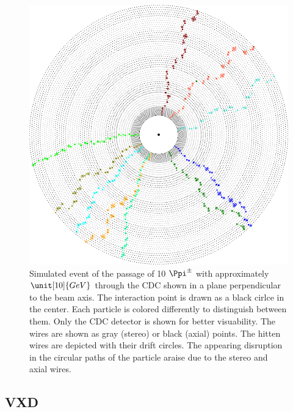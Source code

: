 \begin{figure}
  \centering
  \includegraphics[width=0.8\linewidth]{figures/experimental_setup/eventDisplayPionGun.png}
  \caption{Simulated event of the passage of 10 $\Ppi^\pm$ with approximately $\unit[10]{GeV}$ through the CDC shown in a plane perpendicular to the beam axis. The interaction point is drawn as a black cirlce in the center. Each particle is colored differently to distinguish between them. Only the CDC detector is shown for better visuability. The wires are shown as gray (stereo) or black (axial) points. The hitten wires are depicted with their drift circles. The appearing disruption in the circular paths of the particle araise due to the stereo and axial wires.}
  \label{fig-axial-stereo}
\end{figure}



\subsection{VXD}
